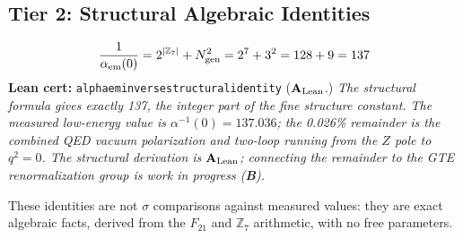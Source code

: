 \documentclass[11pt,openany]{book}
\theoremstyle{remark}
\newcommand{\lean}[1]{%
  \penalty-100
  \begingroup\def\_{\textunderscore\allowbreak}\texttt{#1}\endgroup}
\newcommand{\CatAL}{\ensuremath{\textbf{A}_{\rm Lean}}}
\newcommand{\CatB}{\textbf{B}}
\begin{document}
\subsection*{Tier 2: Structural Algebraic Identities}

\begin{tcolorbox}[colback=orange!5,colframe=orange!60,title={The Fine Structure Constant (\CatAL/\CatB)}]
\[
\frac{1}{\alpha_{\rm em}(0)} = 2^{|\mathbb{Z}_7|} + N_{\rm gen}^2 = 2^7 + 3^2 = 128 + 9 = 137
\]
\textbf{Lean cert:} \lean{alpha\_em\_inverse\_structural\_identity} (\CatAL.)
\textit{The structural formula gives exactly 137, the integer part of the fine structure
constant.  The measured low-energy value is $\alpha^{-1}(0) = 137.036$; the 0.026\%
remainder is the combined QED vacuum polarization and two-loop running from the $Z$ pole
to $q^2 = 0$.  The structural derivation is \CatAL; connecting the remainder to the
GTE renormalization group is work in progress (\CatB).}
\end{tcolorbox}

These identities are not $\sigma$ comparisons against measured values: they are exact
algebraic facts, derived from the $F_{21}$ and $\mathbb{Z}_7$ arithmetic, with
no free parameters.
\end{document}
